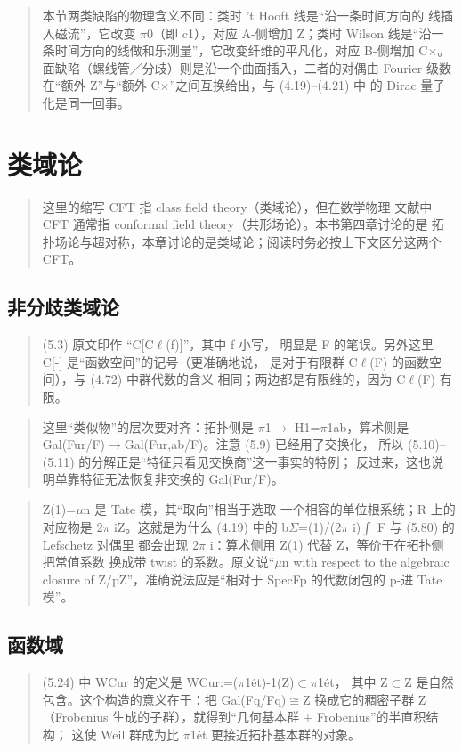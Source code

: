 \begin{quote}\small
本节两类缺陷的物理含义不同：类时 't Hooft 线是“沿一条时间方向的 线插入磁流”，它改变 $\pi$0（即 c1），对应 A-侧增加 Z；类时 Wilson 线是“沿一条时间方向的线做和乐测量”，它改变纤维的平凡化，对应 B-侧增加 C$\times$。面缺陷（螺线管／分歧）则是沿一个曲面插入，二者的对偶由 Fourier 级数在“额外 Z”与“额外 C$\times$”之间互换给出，与 (4.19)--(4.21) 中 的 Dirac 量子化是同一回事。
\end{quote}

\section{类域论}
\begin{quote}\small
这里的缩写 CFT 指 class field theory（类域论），但在数学物理 文献中 CFT 通常指 conformal field theory（共形场论）。本书第四章讨论的是 拓扑场论与超对称，本章讨论的是类域论；阅读时务必按上下文区分这两个 CFT。
\end{quote}

\subsection*{非分歧类域论}
\begin{quote}\small
(5.3) 原文印作 “C[C$\ell$(f)]”，其中 f 小写， 明显是 F 的笔误。另外这里 C[-] 是“函数空间”的记号（更准确地说， 是对于有限群 C$\ell$(F) 的函数空间），与 (4.72) 中群代数的含义 相同；两边都是有限维的，因为 C$\ell$(F) 有限。
\end{quote}

\begin{quote}\small
这里“类似物”的层次要对齐：拓扑侧是 $\pi$1$\to$ H1=$\pi$1ab，算术侧是 Gal(Fur/F)$\to$Gal(Fur,ab/F)。注意 (5.9) 已经用了交换化， 所以 (5.10)--(5.11) 的分解正是“特征只看见交换商”这一事实的特例； 反过来，这也说明单靠特征无法恢复非交换的 Gal(Fur/F)。
\end{quote}

\begin{quote}\small
Z(1)=$\mu$n 是 Tate 模，其“取向”相当于选取 一个相容的单位根系统；R 上的对应物是 2$\pi$ iZ。这就是为什么 (4.19) 中的 b$\Sigma$=(1)/(2$\pi$ i)$\int$ F 与 (5.80) 的 Lefschetz 对偶里 都会出现 2$\pi$ i：算术侧用 Z(1) 代替 Z，等价于在拓扑侧把常值系数 换成带 twist 的系数。原文说“$\mu$n with respect to the algebraic closure of Z/pZ”，准确说法应是“相对于 SpecFp 的代数闭包的 p-进 Tate 模”。
\end{quote}

\subsection*{函数域}
\begin{quote}\small
(5.24) 中 WCur 的定义是 WCur:=($\pi$1ét)-1(Z)$\subset$$\pi$1ét， 其中 Z$\subset$Z 是自然包含。这个构造的意义在于：把 Gal(Fq/Fq)$\cong$Z 换成它的稠密子群 Z （Frobenius 生成的子群），就得到“几何基本群 + Frobenius”的半直积结构； 这使 Weil 群成为比 $\pi$1ét 更接近拓扑基本群的对象。
\end{quote}

